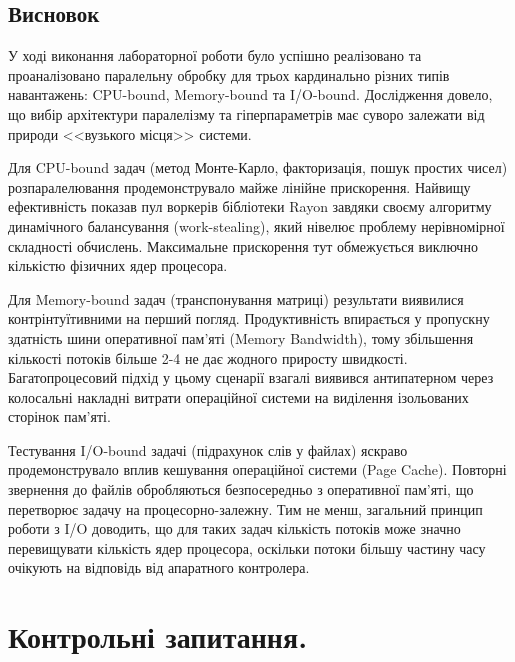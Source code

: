 \documentclass[14pt, a4paper]{extreport}
\begin{document}
	\subsection*{Висновок}
	
	У ході виконання лабораторної роботи було успішно реалізовано та проаналізовано паралельну обробку для трьох кардинально різних типів навантажень: CPU-bound, Memory-bound та I/O-bound. Дослідження довело, що вибір архітектури паралелізму та гіперпараметрів має суворо залежати від природи <<вузького місця>> системи. 
	
	Для CPU-bound задач (метод Монте-Карло, факторизація, пошук простих чисел) розпаралелювання продемонструвало майже лінійне прискорення. Найвищу ефективність показав пул воркерів бібліотеки Rayon завдяки своєму алгоритму динамічного балансування (work-stealing), який нівелює проблему нерівномірної складності обчислень. Максимальне прискорення тут обмежується виключно кількістю фізичних ядер процесора.
	
	Для Memory-bound задач (транспонування матриці) результати виявилися контрінтуїтивними на перший погляд. Продуктивність впирається у пропускну здатність шини оперативної пам'яті (Memory Bandwidth), тому збільшення кількості потоків більше 2-4 не дає жодного приросту швидкості. Багатопроцесовий підхід у цьому сценарії взагалі виявився антипатерном через колосальні накладні витрати операційної системи на виділення ізольованих сторінок пам'яті.
	
	Тестування I/O-bound задачі (підрахунок слів у файлах) яскраво продемонструвало вплив кешування операційної системи (Page Cache). Повторні звернення до файлів обробляються безпосередньо з оперативної пам'яті, що перетворює задачу на процесорно-залежну. Тим не менш, загальний принцип роботи з I/O доводить, що для таких задач кількість потоків може значно перевищувати кількість ядер процесора, оскільки потоки більшу частину часу очікують на відповідь від апаратного контролера.
	
	\section*{Контрольні запитання.}
	
\end{document}
